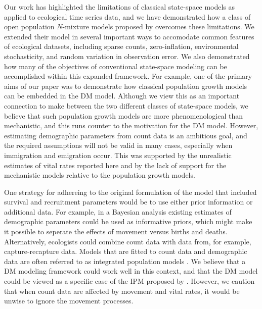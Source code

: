 \documentclass[12pt]{article}
\begin{document}
Our work has highlighted the limitations of classical state-space
models as applied to ecological time series data, and we have
demonstrated how a class of open population $N$-mixture models
proposed by \citet{dail_madsen:2011} overcomes these
limitations. We extended their model in several important
ways to accomodate common features of ecological
datasets, including sparse counts, zero-inflation, environmental
stochasticity, and random variation in observation error.
We also demonstrated how many of the objectives of conventional
state-space modeling can be accomplished within this expanded
framework. For example, one of the primary aims of our paper was to demonstrate how classical
population growth models can be embedded in the DM model.
Although we view this as an important connection to make between the two
different classes of state-space models, we believe that
such population growth models are more phenomenological
than mechanistic, and this runs counter to the motivation for
the DM model. However, estimating
demographic parameters from count data is an ambitious goal, and
the required assumptions will not be valid in many cases,
especially when immigration and emigration occur. This was supported by the
unrealistic estimates of vital rates reported here and by the
lack of support for the mechanistic models relative to the population
growth models.

One strategy for adhereing to the original formulation of the
model that included survival and recruitment parameters would be to
use either prior information or additional data. For example, in a
Bayesian analysis existing estimates of demographic parameters
could be used as informative priors, which might make it possible to
seperate the effects of movement versus births and deaths.
Alternatively, ecologists could combine count data with data
from, for example,
capture-recapture data. Models that are fitted to count data and
demographic data are often referred to as integrated population models
\citep[IPM;][]{besbeas_etal:2002,
buckland_etal:2004,schaub_etal:2007}.
We believe that a DM modeling framework could work well in this context,
and that the DM model could be viewed as a specific case of the
IPM proposed by \citet{buckland_etal:2004}.
However, we caution that when count data are affected by
movement and vital rates, it would be unwise to ignore the movement
processes.
\end{document}
